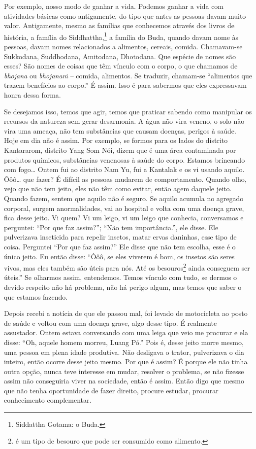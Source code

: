 Por exemplo, nosso modo de ganhar a vida. Podemos ganhar a vida com
atividades básicas como antigamente, do tipo que antes as pessoas davam
muito valor. Antigamente, mesmo as famílias que conhecemos através dos
livros de história, a família do Siddhattha,\footnote{Siddattha Gotama:
o Buda.} a família do Buda, quando davam nome às pessoas, davam nomes
relacionados a alimentos, cereais, comida. Chamavam-se Sukkodana,
Suddhodana, Amitodana, Dhotodana. Que espécie de nomes são esses? São
nomes de coisas que têm vínculo com o corpo, o que chamamos de
\textit{bhojana} ou \textit{bhojanaṁ} – comida, alimentos. Se traduzir,
chamam-se “alimentos que trazem benefícios
ao corpo.” É assim. Isso é para sabermos que eles expressavam honra
dessa forma. 

Se desejamos isso, temos que agir, temos que praticar sabendo como
manipular os recursos da natureza sem gerar desarmonia. A água não vira
veneno, o solo não vira uma ameaça, não tem substâncias que causam
doenças, perigos à saúde. Hoje em dia não é assim. Por exemplo, se
formos para os lados do distrito Kantararom, distrito Yang Som Nói,
dizem que é uma área contaminada por produtos químicos, substâncias
venenosas à saúde do corpo. Estamos brincando com fogo\ldots{} Ontem fui ao
distrito Nam Yu, fui a Kantalak e os vi usando aquilo. Ôôô\ldots{} que fazer?
É difícil as pessoas mudarem de comportamento. Quando olho, vejo que
não tem jeito, eles não têm como evitar, então agem daquele jeito.
Quando fazem, sentem que aquilo não é seguro. Se aquilo acumula no
agregado corporal, surgem anormalidades, vai ao hospital e volta com
uma doença grave, fica desse jeito. Vi quem? Vi um leigo, vi um leigo
que conhecia, conversamos e perguntei: “Por que faz assim?”; “Não tem
importância.”, ele disse. Ele pulverizava inseticida para repelir
insetos, matar ervas daninhas, esse tipo de coisa. Perguntei “Por que
faz assim?” Ele disse que não tem escolha, esse é o único jeito. Eu
então disse: “Ôôô, se eles viverem é bom, os insetos são seres vivos,
mas eles também são úteis para nós. Até os
besouros\footnote{ é um
tipo de besouro que pode ser consumido como alimento.} ainda conseguem
ser úteis.” Se olharmos assim, entendemos. Temos vínculo com tudo, se
dermos o devido respeito não há problema, não há perigo algum, mas
temos que saber o que estamos fazendo. 

Depois recebi a notícia de que ele passou mal, foi levado de
motocicleta ao posto de saúde e voltou com uma doença grave, algo desse
tipo. É realmente assustador. Ontem estava conversando com uma leiga
que veio me procurar e ela disse: “Oh, aquele homem morreu, Luang Pó.”
Pois é, desse jeito morre mesmo, uma pessoa em plena idade produtiva.
Não desligava o trator, pulverizava o dia inteiro, então ocorre desse
jeito mesmo. Por que é assim? É porque ele não tinha outra opção, nunca
teve interesse em mudar, resolver o problema, se não fizesse assim não
conseguiria viver na sociedade, então é assim. Então digo que mesmo que
não tenha oportunidade de fazer direito, procure estudar, procurar
conhecimento complementar.

